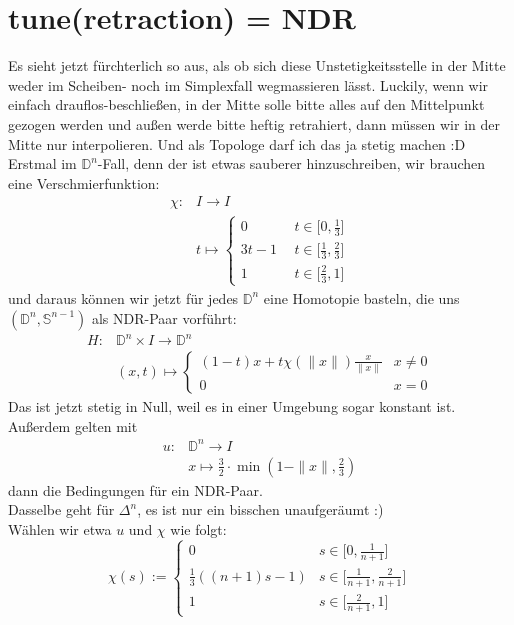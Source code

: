 \documentclass[11pt,twoside,a4paper]{scrbook} %
\begin{document}
\section{tune(retraction) = NDR}
Es sieht jetzt f\"urchterlich so aus, als ob sich diese Unstetigkeitsstelle in der Mitte weder im Scheiben- noch im Simplexfall wegmassieren l\"asst. Luckily, wenn wir einfach drauflos-beschlie\ss en,
in der Mitte solle bitte alles auf den Mittelpunkt gezogen werden und au\ss en werde bitte heftig retrahiert, dann m\"ussen wir in der Mitte nur interpolieren. Und als Topologe darf ich das ja stetig machen
:D \\
Erstmal im $\mathbb{D}^n$-Fall, denn der ist etwas sauberer hinzuschreiben, wir brauchen eine Verschmierfunktion:
$$\begin{aligned}
\chi\colon &I \longrightarrow I\\
&t\mapsto{\begin{cases}0 & ~~t\in\lbrack0,\frac13\rbrack\\ 3t-1 & ~~t\in\lbrack\frac13,\frac23\rbrack\\ 1 &~~ t\in\lbrack\frac23,1\rbrack\end{cases}}
\end{aligned}$$
und daraus k\"onnen wir jetzt f\"ur jedes $\mathbb{D}^n$ eine Homotopie basteln, die uns $(\mathbb{D}^n,\mathbb{S}^{n-1})$ als NDR-Paar vorf\"uhrt:
$$\begin{aligned}
H\colon &\mathbb{D}^n\times I \longrightarrow \mathbb{D}^n\\
&(x,t)\mapsto {\begin{cases}(1-t)x+t\chi(\|x\|)\frac{x}{\|x\|} & x\neq 0 \\ 0 & x=0\end{cases}}
\end{aligned}$$
Das ist jetzt stetig in Null, weil es in einer Umgebung sogar konstant ist. Au\ss erdem gelten mit 
$$\begin{aligned}u\colon &\mathbb{D}^n \rightarrow I\\ &x \mapsto \frac32\cdot\min(1-\|x\|,\frac23)\end{aligned}$$
dann die Bedingungen f\"ur ein NDR-Paar.\\
Dasselbe geht f\"ur $\Delta^n$, es ist nur ein bisschen unaufger\"aumt :)\\
W\"ahlen wir etwa $u$ und $\chi$ wie folgt:\\
$$\chi(s):=\begin{cases}0 & s\in \lbrack 0,\frac1{n+1}\rbrack\\ \frac13((n+1)s-1)&s\in\lbrack\frac1{n+1},\frac2{n+1}\rbrack\\1&s\in\lbrack\frac2{n+1},1\rbrack\end{cases}$$
\end{document}

